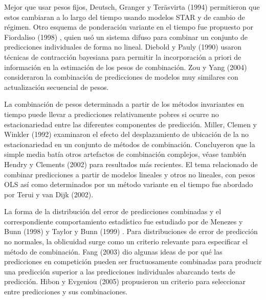 \documentclass{llncs}
\begin{document}
Mejor que usar pesos fijos, Deutsch, Granger y Teräsvirta (1994) \cite{Deutsch199447} permitieron que estos cambiaran a lo largo del tiempo usando modelos STAR y de cambio de régimen. Otro esquema de ponderación variante en el tiempo fue propuesto por Fiordaliso (1998) \cite{Fiordaliso1998367}, quien usó un sistema difuso para combinar un conjunto de predicciones individuales de forma no lineal. Diebold y Pauly (1990) \cite{Diebold1990503} usaron técnicas de contracción bayesiana para permitir la incorporación a priori de información en la estimación de los pesos de combinación. Zou y Yang (2004) \cite{Zou200469} consideraron la combinación de predicciones de modelos muy similares con actualización secuencial de pesos.

La combinación de pesos determinada a partir de los métodos invariantes en tiempo puede llevar a predicciones relativamente pobres si ocurre no estacionariedad entre las diferentes componentes de predicción. Miller, Clemen y Winkler (1992) \cite{Miller1992515} examinaron el efecto del desplazamiento de ubicación de la no estacionariedad en un conjunto de  métodos de combinación. Concluyeron que la simple media batía otros artefactos de combinación complejos, véase también Hendry y Clements (2002) \cite{Hendry20021} para resultados más recientes. El tema relacionado de combinar predicciones a partir de modelos lineales y otros no lineales, con pesos OLS  así como determinados por un método variante en el tiempo fue abordado por Terui y van Dijk (2002)\cite{Terui2002421}.

La forma de la distribución del error de predicciones combinadas y el correspondiente comportamiento estadístico fue estudiado por de Menezes y Bunn (1998) \cite{DeMenezes1998415} y Taylor y Bunn (1999) \cite{Taylor1999325}. Para distribuciones de error de predicción  no normales, la oblicuidad surge como un criterio relevante para especificar el método de combinación. Fang (2003) \cite{Fang200387} dio algunas ideas de por qué las predicciones en competición pueden ser fructuosamente combinadas para producir una predicción superior a las predicciones individuales abarcando tests de predicción. Hibon y Evgeniou (2005) \cite{Hibon200515} propusieron un criterio para seleccionar entre predicciones y sus combinaciones.







\end{document}
